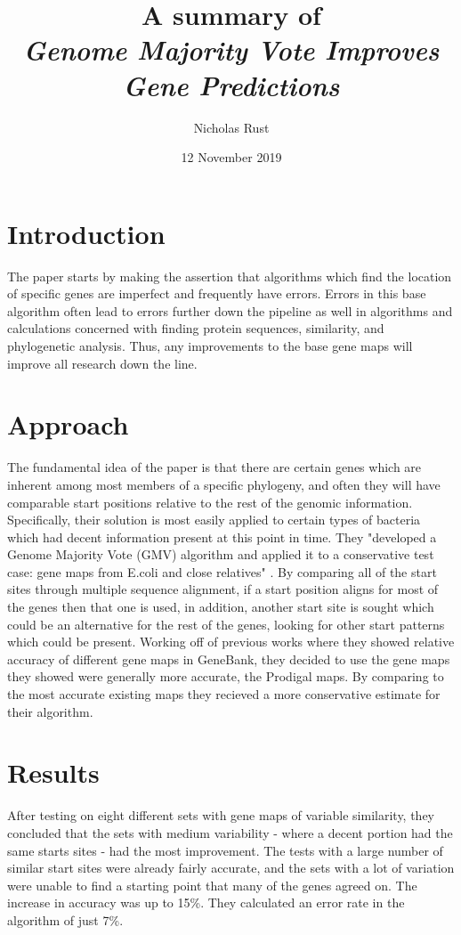\documentclass{article}
\title{A summary of\\ \textit{Genome Majority Vote Improves Gene Predictions}\cite{Geno2011}}
\author{Nicholas Rust}
\date{12 November 2019}
\begin{document}
\maketitle

\section{Introduction}
The paper starts by making the assertion that algorithms which find the location of specific genes are imperfect and frequently have errors. Errors in this base algorithm often lead to errors further down the pipeline as well in algorithms and calculations concerned with finding protein sequences, similarity, and phylogenetic analysis. Thus, any improvements to the base gene maps will improve all research down the line.

\section{Approach}
The fundamental idea of the paper is that there are certain genes which are inherent among most members of a specific phylogeny, and often they will have comparable start positions relative to the rest of the genomic information. Specifically, their solution is most easily applied to certain types of bacteria which had decent information present at this point in time. They "developed a Genome Majority Vote (GMV) algorithm and applied it to a conservative test case: gene maps from E.coli and close relatives" \cite{Geno2011}. By comparing all of the start sites through multiple sequence alignment, if a start position aligns for most of the genes then that one is used, in addition, another start site is sought which could be an alternative for the rest of the genes, looking for other start patterns which could be present.
	Working off of previous works where they showed relative accuracy of different gene maps in GeneBank, they decided to use the gene maps they showed were generally more accurate, the Prodigal maps. By comparing to the most accurate existing maps they recieved a more conservative estimate for their algorithm.
	
\section{Results}
After testing on eight different sets with gene maps of variable similarity, they concluded that the sets with medium variability - where a decent portion had the same starts sites - had the most improvement. The tests with a large number of similar start sites were already fairly accurate, and the sets with a lot of variation were unable to find a starting point that many of the genes agreed on. The increase in accuracy was up to 15\%. They calculated an error rate in the algorithm of just 7\%.
\end{document}
